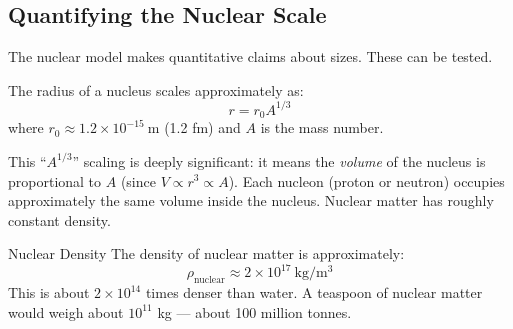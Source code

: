 \documentclass[12pt, a4paper]{book}
\theoremstyle{definition}
\begin{document}
\subsection{Quantifying the Nuclear Scale}

The nuclear model makes quantitative claims about sizes.
These can be tested.

The radius of a nucleus scales approximately as:
\[
  r = r_0 A^{1/3}
\]
where $r_0 \approx 1.2\times10^{-15}\ \si{\metre}$ (1.2 fm)
and $A$ is the mass number.

This ``$A^{1/3}$'' scaling is deeply significant:
it means the \emph{volume} of the nucleus is proportional
to $A$ (since $V \propto r^3 \propto A$).
Each nucleon (proton or neutron) occupies approximately
the same volume inside the nucleus.
Nuclear matter has roughly constant density.

\begin{namedconcept}{Nuclear Density}
The density of nuclear matter is approximately:
\[
  \rho_{\text{nuclear}} \approx 2 \times 10^{17}\ \si{\kilogram\per\metre\cubed}
\]
This is about $2 \times 10^{14}$ times denser than water.
A teaspoon of nuclear matter would weigh about
$10^{11}$ kg --- about 100 million tonnes.
\end{namedconcept}
\end{document}
